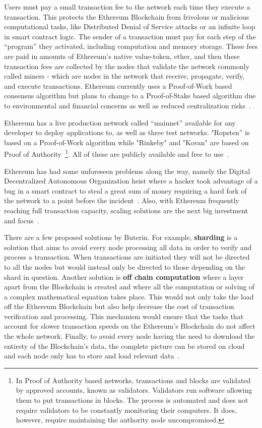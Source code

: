 Users must pay a small transaction fee to the network each time they execute a
transaction. This protects the Ethereum Blockchain from frivolous or malicious
computational tasks, like Distributed Denial of Service attacks or an infinite
loop in smart contract logic. The sender of a transaction must pay for each
step of the “program” they activated, including computation and memory storage.
These fees are paid in amounts of Ethereum’s native value-token, ether, and
then these transaction fees are collected by the nodes that validate the
network commonly called miners - which are nodes in the network that receive,
propagate, verify, and execute transactions. Ethereum currently uses a
Proof-of-Work based consensus algorithm but plans to change to a Proof-of-Stake
based algorithm due to environmental and financial concerns as well as reduced
centralization risks~\cite{EthereumDocs2018,EthereumPOSFAQ2018}.

Ethereum has a live production network called “mainnet” available for any
developer to deploy applications to, as well as three test networks. "Ropsten”
is based on a Proof-of-Work algorithm while "Rinkeby" and "Kovan" are based on
Proof of Authority~\footnote{In Proof of Authority based networks, transactions
and blocks are validated by approved accounts, known as validators. Validators
run software allowing them to put transactions in blocks. The process is
automated and does not require validators to be constantly monitoring their
computers. It does, however, require maintaining the authority node
uncompromised.}. All of these are publicly available and free to
use~\cite{Barclay2017,EthereumTestNetworks2018}.

Ethereum has had some unforeseen problems along the way, namely the Digital
Decentralized Autonomous Organization heist where a hacker took advantage of a
bug in a smart contract to steal a great sum of money requiring a hard fork of
the network to a point before the incident~\cite{Leising2017}. Also, with
Ethereum frequently reaching full transaction capacity, scaling solutions are
the next big investment and focus~\cite{ethereumScalability2018}.

There are a few proposed solutions by Buterin. For example, \textbf{sharding}
is a solution that aims to avoid every node processing all data in order to
verify and process a transaction. When transactions are initiated they will not
be directed to all the nodes but would instead only be directed to those
depending on the shard in question.  Another solution is \textbf{off chain
computation} where a layer apart from the Blockchain is created and where all
the computation or solving of a complex mathematical equation takes place. This
would not only take the load off the Ethereum Blockchain but also help decrease
the cost of transaction verification and processing. This mechanism would
ensure that the tasks that account for slower transaction speeds on the
Ethereum’s Blockchain do not affect the whole network. Finally, to avoid every
node having the need to download the entirety of the Blockchain's data, the
complete picture can be stored on cloud and each node only has to store and
load relevant data~\cite{ethereumBlogScalability2018}.


